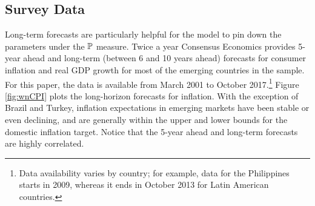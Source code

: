 {%



\subsection{Survey Data} \label{sec:SurveyData}
\iftoggle{toclinks}{\gototoc}{} %

Long-term forecasts are particularly helpful for the model to pin down the parameters under the \(\mathbb{P}\) measure.
Twice a year Consensus Economics provides 5-year ahead and long-term (between 6 and 10 years ahead) forecasts for consumer inflation and real GDP growth for most of the emerging countries in the sample. 
For this paper, the data is available from March 2001 to October 2017.\footnote{ Data availability varies by country; for example, data for the Philippines starts in 2009, whereas it ends in October 2013 for Latin American countries.}
Figure \ref{fig:wnCPI} 
plots the long-horizon forecasts for inflation.
With the exception of Brazil and Turkey, inflation expectations in emerging markets have been stable or even declining, and are generally within the upper and lower bounds for the domestic inflation target.
Notice that the 5-year ahead and long-term forecasts are highly correlated.


}
